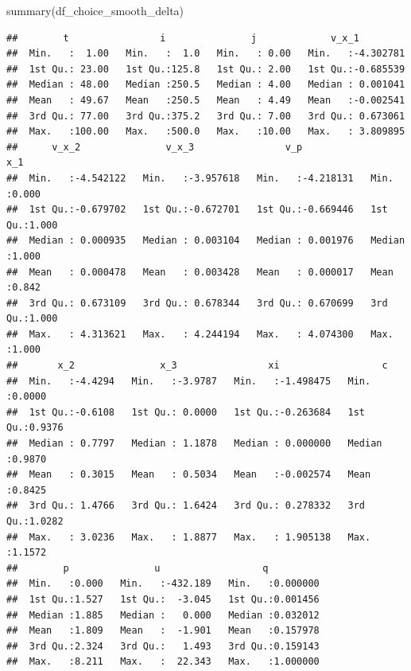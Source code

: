 \documentclass[
]{book}
\newenvironment{Shaded}{\begin{snugshade}}{\end{snugshade}}
\newcommand{\FunctionTok}[1]{\textcolor[rgb]{0.00,0.00,0.00}{#1}}
\newcommand{\NormalTok}[1]{#1}
\newcommand{\SpecialCharTok}[1]{\textcolor[rgb]{0.00,0.00,0.00}{#1}}
\begin{document}
\begin{Shaded}
\begin{Highlighting}[]
\FunctionTok{summary}\NormalTok{(df\_choice\_smooth\_delta)}
\end{Highlighting}
\end{Shaded}

\begin{verbatim}
##        t                i               j             v_x_1          
##  Min.   :  1.00   Min.   :  1.0   Min.   : 0.00   Min.   :-4.302781  
##  1st Qu.: 23.00   1st Qu.:125.8   1st Qu.: 2.00   1st Qu.:-0.685539  
##  Median : 48.00   Median :250.5   Median : 4.00   Median : 0.001041  
##  Mean   : 49.67   Mean   :250.5   Mean   : 4.49   Mean   :-0.002541  
##  3rd Qu.: 77.00   3rd Qu.:375.2   3rd Qu.: 7.00   3rd Qu.: 0.673061  
##  Max.   :100.00   Max.   :500.0   Max.   :10.00   Max.   : 3.809895  
##      v_x_2               v_x_3                v_p                 x_1       
##  Min.   :-4.542122   Min.   :-3.957618   Min.   :-4.218131   Min.   :0.000  
##  1st Qu.:-0.679702   1st Qu.:-0.672701   1st Qu.:-0.669446   1st Qu.:1.000  
##  Median : 0.000935   Median : 0.003104   Median : 0.001976   Median :1.000  
##  Mean   : 0.000478   Mean   : 0.003428   Mean   : 0.000017   Mean   :0.842  
##  3rd Qu.: 0.673109   3rd Qu.: 0.678344   3rd Qu.: 0.670699   3rd Qu.:1.000  
##  Max.   : 4.313621   Max.   : 4.244194   Max.   : 4.074300   Max.   :1.000  
##       x_2               x_3                xi                  c         
##  Min.   :-4.4294   Min.   :-3.9787   Min.   :-1.498475   Min.   :0.0000  
##  1st Qu.:-0.6108   1st Qu.: 0.0000   1st Qu.:-0.263684   1st Qu.:0.9376  
##  Median : 0.7797   Median : 1.1878   Median : 0.000000   Median :0.9870  
##  Mean   : 0.3015   Mean   : 0.5034   Mean   :-0.002574   Mean   :0.8425  
##  3rd Qu.: 1.4766   3rd Qu.: 1.6424   3rd Qu.: 0.278332   3rd Qu.:1.0282  
##  Max.   : 3.0236   Max.   : 1.8877   Max.   : 1.905138   Max.   :1.1572  
##        p               u                  q           
##  Min.   :0.000   Min.   :-432.189   Min.   :0.000000  
##  1st Qu.:1.527   1st Qu.:  -3.045   1st Qu.:0.001456  
##  Median :1.885   Median :   0.000   Median :0.032012  
##  Mean   :1.809   Mean   :  -1.901   Mean   :0.157978  
##  3rd Qu.:2.324   3rd Qu.:   1.493   3rd Qu.:0.159143  
##  Max.   :8.211   Max.   :  22.343   Max.   :1.000000
\end{verbatim}

\begin{Shaded}
\end{Shaded}
\end{document}
